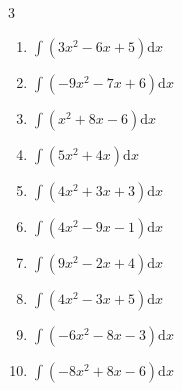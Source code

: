 \begin{multicols}{3}
\begin{enumerate}

\columnbreak %

  \item $\displaystyle \int \left( 3x^{2}-6x+5 \right) \mathrm{d}x$


  \item $\displaystyle \int \left( -9x^{2}-7x+6 \right) \mathrm{d}x$


  \item $\displaystyle \int \left( x^{2}+8x-6 \right) \mathrm{d}x$


  \item $\displaystyle \int \left( 5x^{2}+4x \right) \mathrm{d}x$


  \item $\displaystyle \int \left( 4x^{2}+3x+3 \right) \mathrm{d}x$


  \item $\displaystyle \int \left( 4x^{2}-9x-1 \right) \mathrm{d}x$


  \item $\displaystyle \int \left( 9x^{2}-2x+4 \right) \mathrm{d}x$


  \item $\displaystyle \int \left( 4x^{2}-3x+5 \right) \mathrm{d}x$


  \item $\displaystyle \int \left( -6x^{2}-8x-3 \right) \mathrm{d}x$


  \item $\displaystyle \int \left( -8x^{2}+8x-6 \right) \mathrm{d}x$


\end{enumerate}
\end{multicols}
